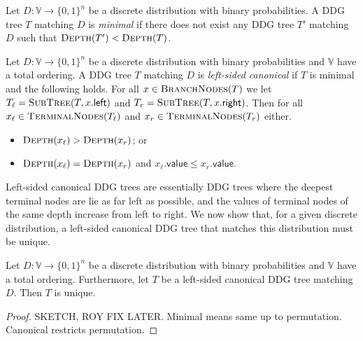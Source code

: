 \begin{definition} \label{def:min-ddg-tree}
Let $D:\mathbb{V} \to \{0, 1\}^n$ be a discrete distribution with binary probabilities. A DDG tree $T$ matching $D$ is \emph{minimal} if there does not exist any DDG tree $T'$ matching $D$ such that $\textsc{Depth}(T') < \textsc{Depth}(T)$.
\end{definition}

\begin{definition} \label{def:canon-ddg-tree}
Let $D:\mathbb{V} \to \{0, 1\}^n$ be a discrete distribution with binary probabilities and $\mathbb{V}$ have a total ordering. 
A DDG tree $T$ matching $D$ is \emph{left-sided canonical} if $T$ is minimal and the following holds. 
For all $x \in \textsc{BranchNodes}(T)$ we let $T_\ell = \textsc{SubTree}(T, x.\mathsf{left})$ and $T_r = \textsc{SubTree}(T, x.\mathsf{right})$. 
Then for all $x_\ell \in \textsc{TerminalNodes}(T_\ell)$ and $x_r \in \textsc{TerminalNodes}(T_r)$ either.
\begin{itemize}
	\item $\textsc{Depth}(x_\ell) > \textsc{Depth}(x_r)$; or
	\item $\textsc{Depth}(x_\ell) = \textsc{Depth}(x_r)$ and $x_\ell.\mathsf{value} \le x_r.\mathsf{value}$.
\end{itemize}
\end{definition}

Left-sided canonical DDG trees are essentially DDG trees where the deepest terminal nodes are lie as far left as possible, and the values of terminal nodes of the same depth increase from left to right.
We now show that, for a given discrete distribution, a left-sided canonical DDG tree that matches this distribution must be unique.

\begin{theorem} \label{thm:uniqueness-of-canon-ddg-trees}
Let $D:\mathbb{V} \to \{0, 1\}^n$ be a discrete distribution with binary probabilities and $\mathbb{V}$ have a total ordering. 
Furthermore, let $T$ be a left-sided canonical DDG tree matching $D$.
Then $T$ is unique.
\end{theorem}

\begin{proof}
SKETCH, ROY FIX LATER. Minimal means same up to permutation. Canonical restricts permutation.
\end{proof}